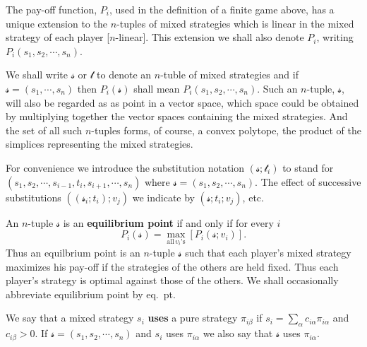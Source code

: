    \begin{definition}
       The pay-off function, $P_i $, used in the definition of a finite game above, has a unique extension to the $n$-tuples of mixed strategies which is linear in the mixed strategy of each player [$n$-linear]. This extension we shall also denote $P_i $, writing $P_i (s_1,s_2,\cdots ,s_n )$.
   \end{definition}
   We shall write $\mathcal{s} $ or $\mathcal{t} $ to denote an $n$-tuble of mixed strategies and if $\mathcal{s} =(s_1,\cdots ,s_n )$ then $P_i (\mathcal{s} )$ shall mean $P_i (s_1,s_2,\cdots ,s_n )$. Such an $n$-tuple, $\mathcal{s} $, will also be regarded as as point in a vector space, which space could be obtained by multiplying together the vector spaces containing the mixed strategies. And the set of all such $n$-tuples forms, of course, a convex polytope, the product of the simplices representing the mixed strategies.

   For convenience we introduce the substitution notation $(\mathcal{s} ;\mathcal{t} _i )$ to stand for $(s_1,s_2,\cdots ,s_{i-1}, t_i ,s_{i+1},\cdots ,s_n )$ where $\mathcal{s} =(s_1,s_2,\cdots ,s_n )$. The effect of successive substitutions $((\mathcal{s} _i ;t_i );v_j )$ we indicate by $(\mathcal{s} ;t_i ;v_j )$, etc.
   \begin{definition}
      An $n$-tuple $\mathcal{s} $ is an \textbf{equilibrium point} if and only if for every $i$ 
      \begin{equation}
          P_i (\mathcal{s} )= \underset{\text{all} \, v_i \text{'s} }{\operatorname{max}}\left[ P_i (\mathcal{s} ;v_i ) \right] .
      \end{equation}
\thispagestyle{empty}
      Thus an equilbrium point is an $n$-tuple $\mathcal{s} $ such that each player's mixed strategy maximizes his pay-off if the strategies of the others are held fixed. Thus each player's strategy is optimal against those of the others. We shall occasionally abbreviate equilibrium point by eq.\ pt.
   \end{definition}
   We say that a mixed strategy $s_i $ \textbf{uses} a pure strategy $\pi_{i\beta }$ if $s_i=\sum_{\alpha }^{} c_{i\alpha }\pi_{i\alpha }$ and $c_{i\beta }>0$. If $\mathcal{s} =(s_1,s_2,\cdots ,s_n )$ and $s_i $ uses $\pi_{i\alpha }$ we also say that $\mathcal{s} $ uses $\pi_{i\alpha }$.

